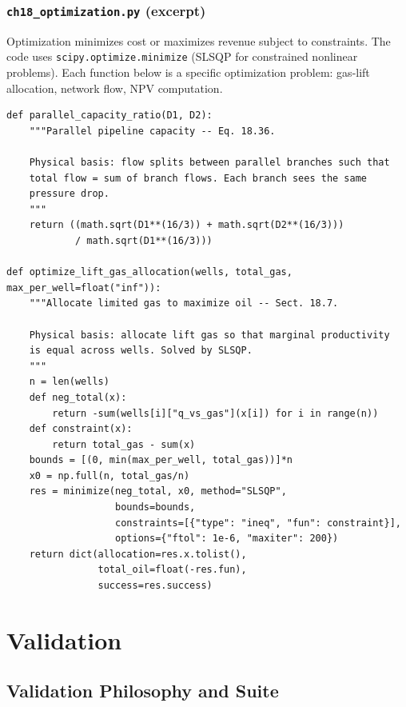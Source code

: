 \documentclass[11pt,a4paper,openany]{book}
\newcommand{\code}[1]{\texttt{#1}}
\begin{document}
\section{\code{ch18\_optimization.py} (excerpt)}

\begin{theory}
Optimization minimizes cost or maximizes revenue subject to
constraints. The code uses \code{scipy.optimize.minimize} (SLSQP
for constrained nonlinear problems). Each function below is a
specific optimization problem: gas-lift allocation, network flow,
NPV computation.
\end{theory}

\begin{lstlisting}
def parallel_capacity_ratio(D1, D2):
    """Parallel pipeline capacity -- Eq. 18.36.

    Physical basis: flow splits between parallel branches such that
    total flow = sum of branch flows. Each branch sees the same
    pressure drop.
    """
    return ((math.sqrt(D1**(16/3)) + math.sqrt(D2**(16/3)))
            / math.sqrt(D1**(16/3)))

def optimize_lift_gas_allocation(wells, total_gas, max_per_well=float("inf")):
    """Allocate limited gas to maximize oil -- Sect. 18.7.

    Physical basis: allocate lift gas so that marginal productivity
    is equal across wells. Solved by SLSQP.
    """
    n = len(wells)
    def neg_total(x):
        return -sum(wells[i]["q_vs_gas"](x[i]) for i in range(n))
    def constraint(x):
        return total_gas - sum(x)
    bounds = [(0, min(max_per_well, total_gas))]*n
    x0 = np.full(n, total_gas/n)
    res = minimize(neg_total, x0, method="SLSQP",
                   bounds=bounds,
                   constraints=[{"type": "ineq", "fun": constraint}],
                   options={"ftol": 1e-6, "maxiter": 200})
    return dict(allocation=res.x.tolist(),
                total_oil=float(-res.fun),
                success=res.success)
\end{lstlisting}

\part{Validation}

\chapter{Validation Philosophy and Suite}
\end{document}
